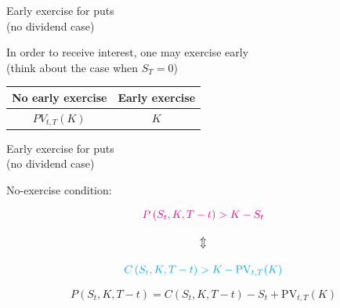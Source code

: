 \begin{frame}[fragile,t]
	\begin{center}
		Early exercise for puts\\
		(no dividend case)
		\bigskip

		In order to receive interest, one may exercise early \\
		(think about the case when $S_T=0$)

		\bigskip

		\renewcommand{\arraystretch}{1.2}
		\begin{tabular}{cc}
			No early exercise & Early exercise \\ \hline
			$PV_{t,T}(K)$     & $K$            \\
		\end{tabular}

	\end{center}
\end{frame}
\begin{frame}[fragile,t]
	\begin{center}
		Early exercise for puts\\
		(no dividend case)
		\bigskip


		No-exercise condition:
		\bigskip

		\begin{gather*}
			\textcolor{magenta}{P\left(S_t,K,T-t\right) > K -S_t} \\[1em]
			\Updownarrow                                          \\[1em]
			\textcolor{cyan}{C\left(S_t,K,T-t\right) > K - \text{PV}_{t,T}(K)}
		\end{gather*}

		\bigskip
		\mySeparateLine
		\bigskip

		\begin{equation*}
			P(S_t,K,T-t) = C(S_t,K,T-t) - S_t + \text{PV}_{t,T}(K)
		\end{equation*}
	\end{center}
\end{frame}
